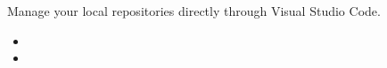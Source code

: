\begin{cvprojects}
  {Manage your local repositories directly through Visual Studio Code.}
  {
    \begin{itemize}
      \item
      \item
    \end{itemize}
  }

\end{cvprojects}